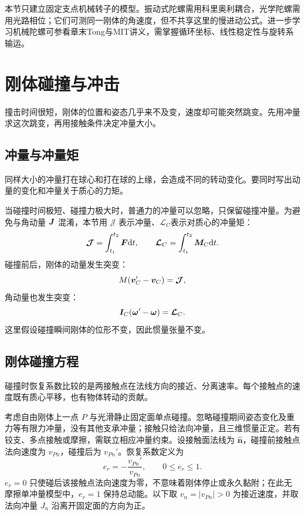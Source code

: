 \begin{modernbox}[title={进一步探索：用什么模型解释陀螺传感器？}]
本节只建立固定支点机械转子的模型。振动式陀螺需用科里奥利耦合，光学陀螺需用光路相位；它们可测同一刚体的角速度，但不共享这里的慢进动公式。进一步学习机械陀螺可参看章末Tong与MIT讲义，需掌握循环坐标、线性稳定性与旋转系输运。
\end{modernbox}


\section{刚体碰撞与冲击}

撞击时间很短，刚体的位置和姿态几乎来不及变，速度却可能突然跳变。先用冲量求这次跳变，再用接触条件决定冲量大小。

\subsection{冲量与冲量矩}

同样大小的冲量打在球心和打在球的上缘，会造成不同的转动变化。要同时写出动量的变化和冲量关于质心的力矩。

当碰撞时间极短、碰撞力极大时，普通力的冲量可以忽略，只保留碰撞冲量。为避免与角动量 \(\boldsymbol{J}\) 混淆，本节用 \(\boldsymbol{\mathcal J}\) 表示冲量、$\boldsymbol{\mathcal L}_C$表示对质心的冲量矩：
\begin{equation}
\boldsymbol{\mathcal J}=\int_{t_1}^{t_2}\boldsymbol{F}\mathrm{d} t,
\qquad
\boldsymbol{\mathcal L}_C=\int_{t_1}^{t_2}\boldsymbol{M}_C\mathrm{d} t.
\label{eq:impulse}
\end{equation}
碰撞前后，刚体的动量发生突变：
\begin{equation}
M(\boldsymbol{v}_C'-\boldsymbol{v}_C)=\boldsymbol{\mathcal J},
\label{eq:impulse-momentum}
\end{equation}
角动量也发生突变：
\begin{equation}
\boldsymbol{I}_C(\boldsymbol{\omega}'-\boldsymbol{\omega})=\boldsymbol{\mathcal L}_C.
\label{eq:impulse-angular}
\end{equation}
这里假设碰撞瞬间刚体的位形不变，因此惯量张量不变。

\subsection{刚体碰撞方程}

碰撞时恢复系数比较的是两接触点在法线方向的接近、分离速率。每个接触点的速度既有质心平移，也有物体转动的贡献。

考虑自由刚体上一点 \(P\) 与光滑静止固定面单点碰撞。忽略碰撞期间姿态变化及重力等有限力冲量，没有其他支承冲量；接触只给法向冲量，且三维惯量正定。若有铰支、多点接触或摩擦，需联立相应冲量约束。设接触面法线为 \(\hat{\boldsymbol{n}}\)，碰撞前接触点法向速度为 \(v_{Pn}\)，碰撞后为 \(v_{Pn}'\)。恢复系数定义为
\begin{equation}
e_r=-\frac{v_{Pn}'}{v_{Pn}},
\qquad 0\le e_r\le1.
\label{eq:restitution}
\end{equation}
\(e_r=0\) 只使碰后该接触点法向速度为零，不意味着刚体停止或永久黏附；在此无摩擦单冲量模型中，\(e_r=1\) 保持总动能。以下取 \(v_n=|v_{Pn}|>0\) 为接近速度，并取法向冲量 \(J_n\) 沿离开固定面的方向为正。

